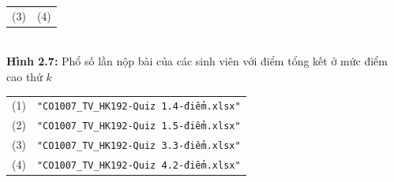 \documentclass[a4paper]{article}
\theoremstyle{definition}
\begin{document}
\begin{enumerate}[a)]
\begin{itemize}
\begin{center}
\begin{tabular}{c c}
                 (3) & (4)
            \end{tabular}\\
            \textbf{Hình 2.7:} Phổ số lần nộp bài của các sinh viên với điểm tổng kết ở mức điểm cao thứ $k$\\
            \begin{tabular}{c c}
                 (1) & \texttt{"CO1007\_TV\_HK192-Quiz 1.4-điểm.xlsx"}\\
                 (2) & \texttt{"CO1007\_TV\_HK192-Quiz 1.5-điểm.xlsx"}\\
                 (3) & \texttt{"CO1007\_TV\_HK192-Quiz 3.3-điểm.xlsx"}\\
                 (4) & \texttt{"CO1007\_TV\_HK192-Quiz 4.2-điểm.xlsx"}
            \end{tabular}
        \end{center}
    \end{itemize}
\end{enumerate}


\end{document}
